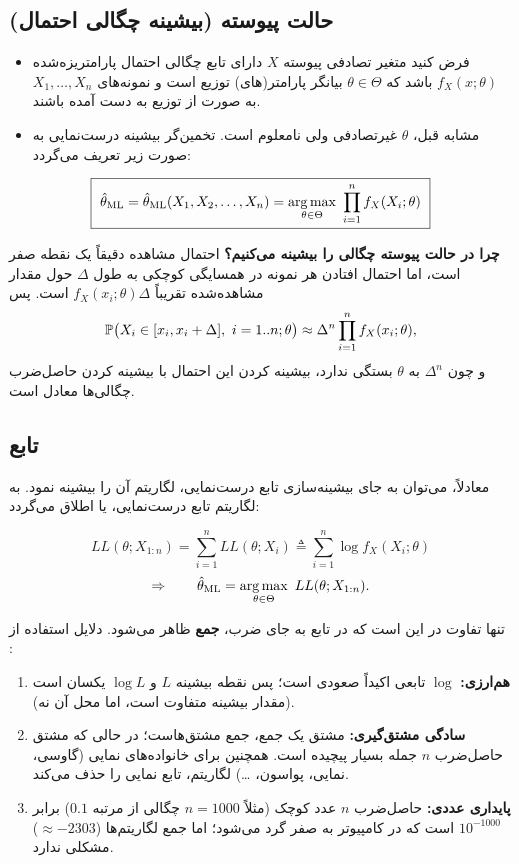 \subsection{حالت پیوسته (بیشینه چگالی احتمال)}
\begin{itemize}
\item فرض کنید متغیر تصادفی پیوسته $X$ دارای تابع چگالی احتمال  پارامتریزه‌شده $f_X(x;\theta)$ باشد که $\theta\in\Theta$ بیانگر پارامتر(های) توزیع است و نمونه‌های $X_1,\ldots,X_n$ به صورت  از توزیع به دست آمده باشند.
\item مشابه قبل، $\theta$ غیرتصادفی ولی نامعلوم است. تخمین‌گر بیشینه درست‌نمایی به صورت زیر تعریف می‌گردد:
\end{itemize}
\begin{definition}
\[
\boxed{\ \hat\theta_\ML=\hat\theta_\ML(X_1,X_2,\ldots,X_n)=\argmax_{\theta\in\Theta}\ \prod_{i=1}^nf_X(X_i;\theta)\ }
\]
\end{definition}

\begin{note}
\notetitle \textbf{چرا در حالت پیوسته چگالی را بیشینه می‌کنیم؟} احتمال مشاهده دقیقاً یک نقطه صفر است، اما احتمال افتادن هر نمونه در همسایگی کوچکی به طول $\Delta$ حول مقدار مشاهده‌شده تقریباً $f_X(x_i;\theta)\Delta$ است. پس
\[
\Prob\big(X_i\in[x_i,x_i+\Delta],\ i=1..n;\theta\big)\approx\Delta^n\prod_{i=1}^nf_X(x_i;\theta),
\]
و چون $\Delta^n$ به $\theta$ بستگی ندارد، بیشینه کردن این احتمال با بیشینه کردن حاصل‌ضرب چگالی‌ها معادل است.
\end{note}

\subsection{تابع }
معادلاً، می‌توان به جای بیشینه‌سازی تابع درست‌نمایی، لگاریتم آن را بیشینه نمود. به لگاریتم تابع درست‌نمایی،  یا  اطلاق می‌گردد:
\begin{definition}
\[
\boxed{\ LL(\theta;X_{1:n})=\sum_{i=1}^nLL(\theta;X_i)\triangleq\sum_{i=1}^n\log f_X(X_i;\theta)\ }
\]
\[
\Rightarrow\qquad
\hat\theta_\ML=\argmax_{\theta\in\Theta}\ LL(\theta;X_{1:n}).
\]
\end{definition}
تنها تفاوت در این است که در تابع  به جای ضرب، \textbf{جمع} ظاهر می‌شود. دلایل استفاده از :
\begin{enumerate}
\item \textbf{هم‌ارزی:} $\log$ تابعی اکیداً صعودی است؛ پس نقطه بیشینه $L$ و $\log L$ یکسان است (مقدار بیشینه متفاوت است، اما محل آن نه).
\item \textbf{سادگی مشتق‌گیری:} مشتق یک جمع، جمع مشتق‌هاست؛ در حالی که مشتق حاصل‌ضرب $n$ جمله بسیار پیچیده است. همچنین برای خانواده‌های نمایی (گاوسی، نمایی، پواسون، \ldots) لگاریتم، تابع نمایی را حذف می‌کند.
\item \textbf{پایداری عددی:} حاصل‌ضرب $n$ عدد کوچک (مثلاً $n=1000$ چگالی از مرتبه $0.1$) برابر $10^{-1000}$ است که در کامپیوتر به صفر گرد می‌شود؛ اما جمع لگاریتم‌ها ($\approx-2303$) مشکلی ندارد.
\end{enumerate}

